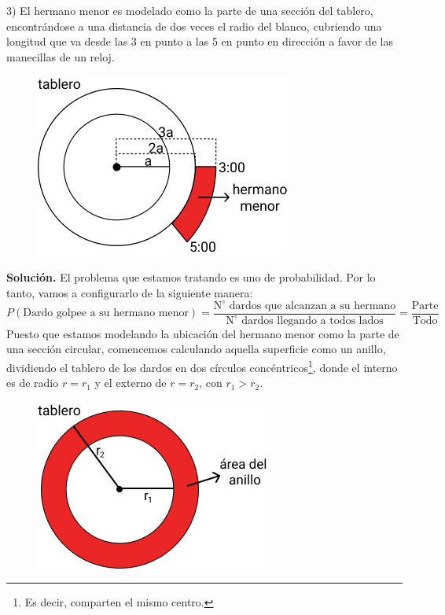 \documentclass[12pt]{article}
\begin{document}
3) El hermano menor es modelado como la parte de una sección del tablero, encontrándose a una distancia de dos veces el radio del blanco, cubriendo una longitud que va desde las 3 en punto a las 5 en punto en dirección a favor de las manecillas de un reloj.

\begin{figure}[hbt!]
\centering
\includegraphics[scale=0.6]{img/darts-prob-example-2.jpg}
\end{figure}

\textbf{Solución.} El problema que estamos tratando es uno de probabilidad. Por lo tanto, vamos a configurarlo de la siguiente manera:
\[
  P(\text{Dardo golpee a su hermano menor}) = \frac{\text{N}^{\underline{\circ}} \text{ dardos que alcanzan a su hermano}}{\text{N}^{\underline{\circ}} \text{ dardos llegando a todos lados}}
                                            = \frac{\text{Parte}}{\text{Todo}}
\]
Puesto que estamos modelando la ubicación del hermano menor como la parte de una sección circular, comencemos calculando aquella superficie como un anillo, dividiendo el tablero de los dardos en dos círculos concéntricos\footnote{Es decir, comparten el mismo centro.}, donde el interno es de radio $r = r_{1}$ y el externo de $r = r_{2}$, con $r_{1} > r_{2}$.

\newpage

\begin{figure}[hbt!]
\centering
\includegraphics[scale=0.6]{img/darts-prob-example-3.jpg}
\end{figure}
\end{document}
